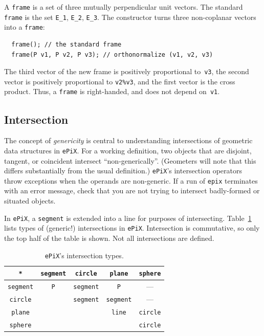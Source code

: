 \documentclass[12pt]{report}
\newcommand{\code}[1]{\texttt{#1}}
\newcommand{\ePiX}{\code{ePiX}}
\begin{document}
A \code{frame} is a set of three mutually perpendicular unit vectors.
The standard \code{frame} is the set \code{E\_1}, \code{E\_2},
\code{E\_3}. The constructor turns three non-coplanar vectors into a
\code{frame}:
\begin{verbatim}
  frame(); // the standard frame
  frame(P v1, P v2, P v3); // orthonormalize (v1, v2, v3)
\end{verbatim}
The third vector of the new frame is positively proportional
to~\code{v3}, the second vector is positively proportional to
\code{v2\%v3}, and the first vector is the cross product. Thus, a
\code{frame} is right-handed, and does not depend on~\code{v1}.


\subsection*{Intersection}

The concept of \emph{genericity} is central to understanding
intersections of geometric data structures in \ePiX. For a working
definition, two objects that are disjoint, tangent, or coincident
intersect ``non-generically''. (Geometers will note that this differs
substantially from the usual definition.)  \ePiX's intersection
operators throw exceptions when the operands are non-generic. If a run
of \code{epix} terminates with an error message, check that you are
not trying to intersect badly-formed or situated objects.

In \ePiX, a \code{segment} is extended into a line for purposes of
intersecting.  Table~\ref{table:intersect} lists types of (generic!)
intersections in \ePiX. Intersection is commutative, so only the top
half of the table is shown. Not all intersections are defined.
\begin{table}[hbt]
\begin{center}
  \begin{tabular}{c|cccc}
    \code{*} & 
    \code{segment} & \code{circle} & \code{plane} & \code{sphere} \\
    \hline
    \code{segment} & \code{P} & \code{segment} & \code{P} & --- \\
    \code{circle}  &    & \code{segment} & \code{segment} & --- \\
    \code{plane}   &    &    &   \code{line} & \code{circle} \\
    \code{sphere}  &    &    &    & \code{circle}
  \end{tabular}
  \caption{\ePiX's intersection types.}
  \label{table:intersect}
\end{center}
\end{table}
\end{document}
